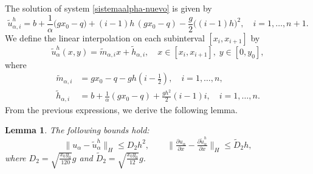 \documentclass[11pt]{article}
\newcommand\pder[2][]{\ensuremath{\tfrac{\partial#1}{\partial#2}}}
\newtheorem{Lemma}{Lemma}
\begin{document}
\begin{flushleft}
  
  
The solution of system \eqref{sistemaalpha-nuevo} is given by
\begin{equation}
\label{eq:solucion_indices_alpha}
{\widetilde{u}^h_{\alpha,i}} =
b + \frac{1}{\alpha} \Big( g x_0 - q \Big)
+ (i-1) h \,(g x_0 - q) - \frac{g}{2} \big((i-1) h\big)^2,
\quad i=1,\dots,n+1.
\end{equation}
We define the linear interpolation on each subinterval $[x_i, x_{i+1}]$ by
\begin{equation}\label{uhalpha-nueva}
{\widetilde{u}^h_\alpha}(x,y) = \widetilde{m}_{\alpha,i} x + \widetilde{h}_{\alpha,i}, \quad x\in[x_i,x_{i+1}],\; y\in[0,y_0], 
\end{equation}
where
\begin{align}
\widetilde{m}_{\alpha,i} &= g x_0 - q - gh \left(i - \frac{1}{2}\right), \quad i=1,\dots,n,\\[2mm]
\widetilde{h}_{\alpha,i} &= b + \frac{1}{\alpha} (g x_0 - q ) + \frac{g h^2}{2} (i-1) i, \quad i=1,\dots,n.
\end{align}
From the previous expressions, we derive the following lemma.
\begin{Lemma} \label{Cota u uh alpha} The following bounds hold:
\[
\lVert u_\alpha - {\widetilde{u}^h_\alpha} \rVert_H \leq D_2 h^2, \qquad
\lVert \pder[u_\alpha]{x} - \pder[{\widetilde{u}^h_\alpha}]{x} \rVert_H \leq \widetilde{D}_2 h,
\]
where $D_2 = \sqrt{\frac{x_0 y_0}{120}} g$ and $\widetilde{D}_2 = \sqrt{\frac{x_0 y_0}{12}} g$.


\end{Lemma}


\end{flushleft}
\end{document}
